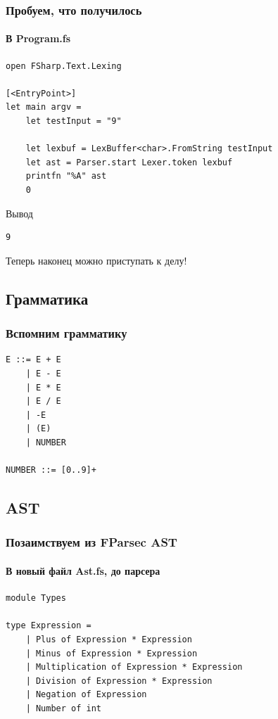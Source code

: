 \documentclass[xetex,mathserif,serif]{beamer}
\begin{document}
    \begin{frame}[fragile]
        \frametitle{Пробуем, что получилось}
        \framesubtitle{В Program.fs}
        \begin{small}
            \begin{verbatim}
open FSharp.Text.Lexing

[<EntryPoint>]
let main argv =
    let testInput = "9"

    let lexbuf = LexBuffer<char>.FromString testInput
    let ast = Parser.start Lexer.token lexbuf
    printfn "%A" ast
    0 
            \end{verbatim}
        \end{small}
        \begin{exampleblock}{Вывод}
            \begin{verbatim}
9
            \end{verbatim}
        \end{exampleblock}
        Теперь наконец можно приступать к делу!
    \end{frame}

    \subsection{Грамматика}

    \begin{frame}[fragile]
        \frametitle{Вспомним грамматику}
        \begin{verbatim}
E ::= E + E
    | E - E
    | E * E
    | E / E
    | -E
    | (E)
    | NUMBER

NUMBER ::= [0..9]+
        \end{verbatim}
    \end{frame}

    \subsection{AST}

    \begin{frame}[fragile]
        \frametitle{Позаимствуем из FParsec AST}
        \framesubtitle{В новый файл Ast.fs, до парсера}
        \begin{verbatim}
module Types

type Expression =
    | Plus of Expression * Expression
    | Minus of Expression * Expression
    | Multiplication of Expression * Expression
    | Division of Expression * Expression
    | Negation of Expression
    | Number of int
        \end{verbatim}
    \end{frame}
\end{document}
